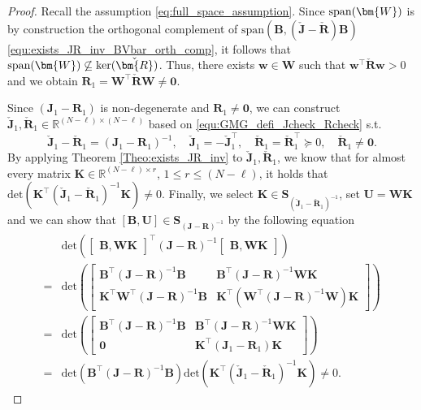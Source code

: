 \documentclass{article}
\newcommand{\bmK}{\bm{K}}
\newcommand{\bmU}{\bm{U}}
\newcommand{\bmW}{\bm{W}}
\newcommand{\bmJ}{\bm{J}}
\newcommand{\bmR}{\bm{R}}
\newcommand{\bmB}{\bm{B}}
\newcommand{\R}{\mathbb{R}}
\newcommand{\bzero}{\mathbf{0}}
\newcommand{\FOMsize}{N}
\newcommand{\ROMsize}{r}
\newcommand{\matset}{\mathbf{S}}
\newcommand{\Jcheck}{\check{\bmJ}}
\newcommand{\Rcheck}{\check{\bmR}}
\begin{document}
\begin{proof}
Recall the assumption \eqref{eq:full_space_assumption}. Since $\textnormal{span}(\bmW)$ is by construction the orthogonal complement of $\mathrm{span}(
					\bmB, (\Jcheck-\Rcheck)\bmB)$ \eqref{equ:exists_JR_inv_BVbar_orth_comp}, it follows that $\textnormal{span}(\bmW) \not\subseteq \mathrm{ker}(\Rcheck)$. Thus, there exists $\bm{w} \in \bmW$ such that $\bm{w}^{\top} \Rcheck \bm{w} >0$ and we obtain $\bmR_1 = \bmW^{\top}\Rcheck\bmW \neq \bzero$.	
					
Since $(\bmJ_1-\bmR_1)$ is non-degenerate and $\bmR_1 \neq \bzero$, we can construct $\Jcheck_1,\Rcheck_1\in\R^{(\FOMsize-\ell)\times(\FOMsize-\ell)}$ based on \eqref{equ:GMG_defi_Jcheck_Rcheck} s.t.
			\begin{equation*}
				\Jcheck_1-\Rcheck_1 = (\bmJ_1-\bmR_1)^{-1},\quad
				\Jcheck_1=-\Jcheck_1^{\top},\quad
				\Rcheck_1 =\Rcheck_1^{\top}\succeq 0,\quad
				\Rcheck_1\neq \bzero.				
			\end{equation*}
By applying Theorem \ref{Theo:exists_JR_inv} to $\Jcheck_1, \Rcheck_1$, we know that for almost every matrix $\bmK\in\R^{(\FOMsize-\ell)\times \ROMsize}$, $1 \leq \ROMsize\leq(\FOMsize-\ell)$, it holds that $\mathrm{det}(\bmK^{\top}(\Jcheck_1-\Rcheck_1)^{-1}\bmK)\neq 0$.
			Finally, we select $\bmK\in\matset_{(\Jcheck_1-\Rcheck_1)^{-1}}$, set $\bmU= \bmW\bmK$ and we can show that $[\bmB,\bmU]\in\matset_{(\bmJ-\bmR)^{-1}}$ by the following equation
			\begin{align*}
				&\mathrm{det}\left(
				\begin{bmatrix}
					\bmB,\bmW\bmK
				\end{bmatrix}^{\top}
				(\bmJ-\bmR)^{-1}
				\begin{bmatrix}
					\bmB,\bmW\bmK
				\end{bmatrix}
				\right)
				\\
				=
				&
				\mathrm{det}\left(
				\begin{bmatrix}
					\bmB^{\top}	(\bmJ-\bmR)^{-1}\bmB&
					\bmB^{\top}	(\bmJ-\bmR)^{-1}\bmW\bmK\\
					\bmK^{\top}\bmW^{\top}(\bmJ-\bmR)^{-1}\bmB&
					\bmK^{\top}(\bmW^{\top}(\bmJ-\bmR)^{-1}\bmW)\bmK
				\end{bmatrix}
				\right)
				\\
				=
				&
				\mathrm{det}\left(
				\begin{bmatrix}
					\bmB^{\top}	(\bmJ-\bmR)^{-1}\bmB&
					\bmB^{\top}	(\bmJ-\bmR)^{-1}\bmW\bmK\\
					\bzero&
					\bmK^{\top}(\bmJ_1-\bmR_1)\bmK
				\end{bmatrix}
				\right)
				\\
				=
				&
				\mathrm{det}\left(\bmB^{\top}	(\bmJ-\bmR)^{-1}\bmB\right)
				\mathrm{det}\left(\bmK^{\top}(\Jcheck_1-\Rcheck_1)^{-1}\bmK\right)
				\neq
				0.
\end{align*}							
\end{proof}					
		
\end{document}

